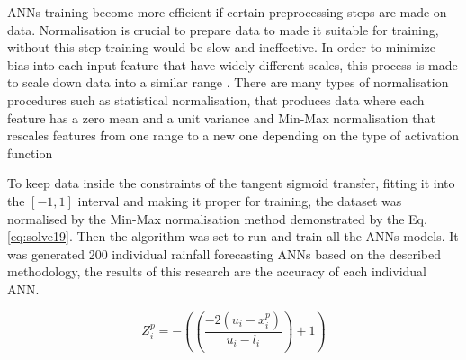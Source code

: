 \newpage

ANNs training become more efficient if certain preprocessing steps are made on data. Normalisation is crucial to prepare data to made it suitable for training, without this step training would be slow and ineffective. In order to minimize bias into each input feature that have widely different scales, this process is made to scale down data into a similar range \cite{yaldi2009improving}. There are many types of normalisation procedures such as statistical normalisation, that produces data where each feature has a zero mean and a unit variance and Min-Max normalisation that rescales features from one range to a new one depending on the type of activation function    

To keep data inside the constraints of the tangent sigmoid transfer, fitting it into the $[-1, 1]$ interval and making it proper for training, the dataset was normalised by the Min-Max normalisation method demonstrated by the Eq. \ref{eq:solve19}. Then the algorithm was set to run and train all the ANNs models. It was generated 200 individual rainfall forecasting ANNs based on the described methodology, the results of this research are the accuracy of each individual ANN.

\begin{equation}
 \label{eq:solve19}
 Z_i^p = -((\frac{-2(u_i - x_i^p)}{u_i - l_i}) + 1)
\end{equation}

%


